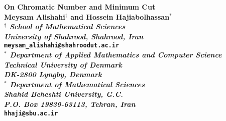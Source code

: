 \documentclass[11pt]{article}
\begin{document}
\begin{center}
{\Large \bf  On Chromatic Number and Minimum Cut}\\
\vspace{0.3 cm}
{\bf Meysam Alishahi$^\dag$ and Hossein Hajiabolhassan$^\ast$\\
{\it $^\dag$ School of Mathematical Sciences}\\
{\it University of Shahrood, Shahrood, Iran}\\
{\tt meysam\_alishahi@shahroodut.ac.ir}\\
{\it $^\ast$ Department of Applied Mathematics and Computer Science}\\
{\it Technical University of Denmark}\\
{\it DK-{\rm 2800} Lyngby, Denmark}\\
{\it $^\ast$ Department of Mathematical Sciences}\\
{\it Shahid Beheshti University, G.C.}\\
{\it P.O. Box {\rm 19839-63113}, Tehran, Iran}\\
{\tt hhaji@sbu.ac.ir}\\
}
\end{center}
\begin{abstract}
\noindent 
For a graph $G$,  the tree graph ${\cal T}_{G,t}$ has all tree subgraphs of $G$ with $t$ vertices as vertex set and two tree subgraphs are neighbors if they are edge-disjoint. Also, the $r^{th}$ cut number of $G$ is the minimum number of edges between parts of a partition of vertex set of $G$ into two parts such that each part has size at least $r$. We show that 
if $t=(1-o(1))n$ and $n$ is large enough, then for any dense graph $G$ with $n$ vertices, the chromatic number of  the tree graph ${\cal T}_{G,t}$ is equal to  the $(n-t+1)^{th}$ cut number of $G$. In particular, as a consequence, we prove that if $n$ is large enough and $G$ is a dense graph, then the chromatic number of the spanning tree graph ${\cal T}_{G,n}$ is equal to the size of the minimum cut of $G$. The proof method is based on alternating Tur\'an number inspired by Tucker's lemma, an equivalent combinatorial version of the Borsuk-Ulam theorem.\\

\ { Chromatic Number, General Kneser Graph, Minimum Cut.}\\
{\bf Subject classification: 05C15}
\end{abstract}
\end{document}
